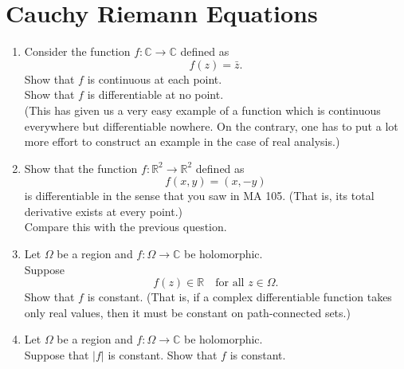 \documentclass[12pt]{article}
\theoremstyle{definition}
\numberwithin{thm}{section}
\begin{document}
\newpage\section{Cauchy Riemann Equations}
\begin{enumerate}
	\item Consider the function $f:\mathbb{C} \to \mathbb{C}$ defined as
	\begin{equation*} 
		f(z) = \bar{z}.
	\end{equation*}
	Show that $f$ is continuous at each point.\\
	Show that $f$ is differentiable at no point.\\
	(This has given us a very easy example of a function which is continuous everywhere but differentiable nowhere. On the contrary, one has to put a lot more effort to construct an example in the case of real analysis.)
	\item Show that the function $f:\mathbb{R}^2\to\mathbb{R}^2$ defined as
	\begin{equation*} 
		f(x, y) = (x, -y)
	\end{equation*}
	is differentiable in the sense that you saw in MA 105. (That is, its total derivative exists at every point.)\\
	Compare this with the previous question.
	\item Let $\Omega$ be a region and $f:\Omega \to \mathbb{C}$ be holomorphic.\\
	Suppose
	\begin{equation*} 
		f(z) \in \mathbb{R} \quad \text{for all } z \in \Omega.
	\end{equation*}
	Show that $f$ is constant. (That is, if a complex differentiable function takes only real values, then it must be constant on path-connected sets.)
	\item Let $\Omega$ be a region and $f:\Omega \to \mathbb{C}$ be holomorphic.\\
	Suppose that $|f|$ is constant. Show that $f$ is constant.
\end{enumerate} 
\end{document}
